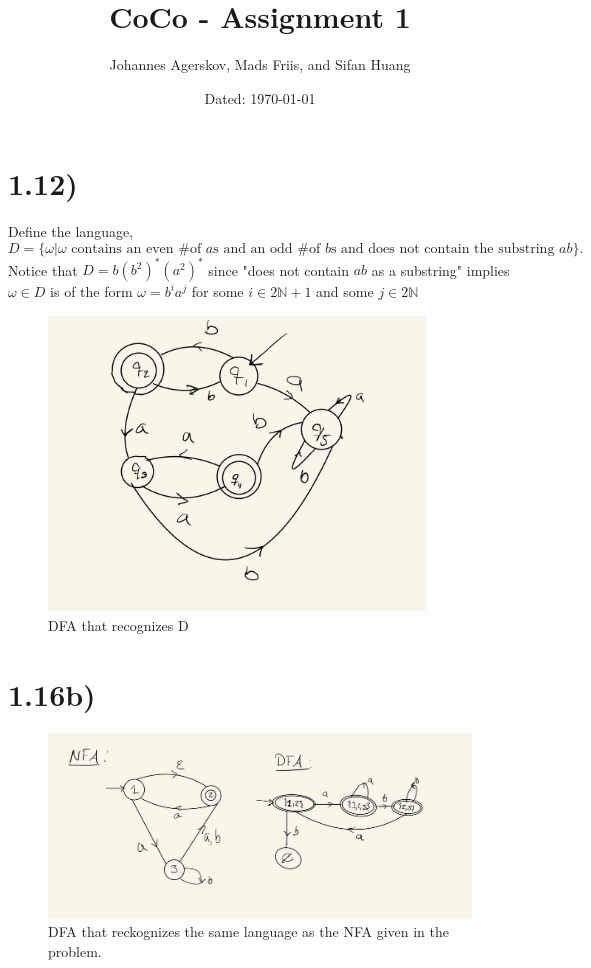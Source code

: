 \documentclass[a4paper,11pt]{article}
\author{Johannes Agerskov, Mads Friis, and Sifan Huang}
\date{Dated: \today}
\title{CoCo - Assignment 1}
\numberwithin{equation}{section}
\begin{document}
	\maketitle
	
	
\section*{1.12)}
Define the language, \begin{equation}
     D=\{\omega | \omega \text{ contains an even \# of }a\text{s and an odd \# of }b\text{s and does not contain the substring }ab\}.
\end{equation}
Notice that $D=b(b^2)^*(a^2)^*$ since "does not contain $ab$ as a substring" implies $\omega\in D$ is of the form $\omega=b^ia^j$ for some $i\in2\mathbb{N}+1$ and some $j\in2\mathbb{N}$

\begin{figure}[htp]
    \centering
    \includegraphics[width=10cm]{112.jpg}
    \caption{DFA that recognizes D}
    \label{fig:1.12}
\end{figure}
\vspace{1cm}
\pagebreak
\section*{1.16b)}
\begin{figure}[htp]
    \centering
    \includegraphics[width=14cm]{116.jpg}
    \caption{DFA that reckognizes the same language as the NFA given in the problem.}
    \label{fig:1.16}
\end{figure}
\vspace{1cm}
\end{document}
